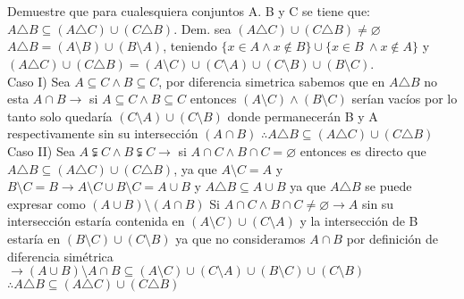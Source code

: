 \section{}
Demuestre  que para cualesquiera conjuntos A. B y C se tiene que:\newline
$A \triangle B \subseteq (A \triangle C) \cup (C \triangle B) $.\newline
Dem. sea $(A \triangle C) \cup (C \triangle B) \neq \varnothing $\newline
$A \triangle B = ( A \setminus B) \cup (B \setminus A)$, teniendo $ \{ x \in A \wedge x \notin B \} \cup \{x \in B\ \wedge x \notin A \}$ y $(A \triangle C) \cup (C \triangle B) = (A \setminus C) \cup (C \setminus A) \cup (C \setminus B) \cup (B \setminus C)$.\newline\\

Caso I) Sea $A \subseteq C \wedge B \subseteq C$, por diferencia simetrica sabemos que en $A \triangle B$ no esta $A \cap B \rightarrow$ si $A \subseteq C \wedge B \subseteq C$ entonces $(A \setminus C) \wedge (B \setminus C)$ serían vacíos por lo tanto solo quedaría $(C \setminus A) \cup (C \setminus B)$ donde permanecerán B y A respectivamente sin su intersección $(A \cap B)$\newline
$\therefore A \triangle B \subseteq (A \triangle C) \cup (C \triangle B)$\newline\\

Caso II) Sea $A \subsetneqq C \wedge B \subsetneqq C \rightarrow$ si $A \cap C \wedge B \cap C = \varnothing$ entonces es directo que $A \triangle B \subseteq (A \triangle C)\cup (C \triangle B)$, ya que $A \setminus C = A$ y $B \setminus C =  B \rightarrow A \setminus C \cup B \setminus C = A \cup B$ y $A \triangle B \subseteq A \cup B$ ya que $A \triangle B$ se puede expresar como $(A \cup B) \setminus (A \cap B)$\newline
Si $A \cap C \wedge B \cap C \neq \varnothing \rightarrow A$ sin su intersección estaría contenida en $(A \setminus C) \cup (C \setminus A)$ y la intersección de B estaría en $(B \setminus C) \cup (C \setminus B)$ ya que no consideramos $A \cap B$ por definición de diferencia simétrica $\rightarrow (A \cup B)\setminus A \cap B \subseteq (A \setminus C)\cup (C \setminus A)\cup (B \setminus C) \cup (C \setminus B) $\newline
$\therefore A \triangle B \subseteq (A \triangle C) \cup (C \triangle B)$\newline\\

